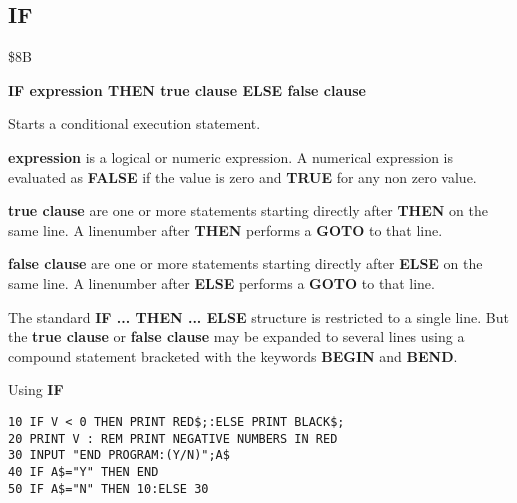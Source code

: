 \subsection{IF}
\begin{description}[leftmargin=2cm,style=nextline]
\item [Token:] \$8B
\item [Format:] {\bf IF expression THEN true clause ELSE false clause}
\item [Usage:] Starts a conditional execution
               statement.

               {\bf expression} is a logical or numeric expression.
               A numerical expression is evaluated as {\bf FALSE}
               if the value is zero and {\bf TRUE} for any non zero
               value.

               {\bf true clause} are one or more statements starting
               directly after {\bf THEN} on the same line.
               A linenumber after {\bf THEN} performs a
               {\bf GOTO} to that line.

               {\bf false clause} are one or more statements starting
               directly after {\bf ELSE} on the same line.
               A linenumber after {\bf ELSE} performs a
               {\bf GOTO} to that line.

\item [Remarks:]
               The standard {\bf IF ... THEN ... ELSE} structure
               is restricted to a single line. But the {\bf true clause}
               or {\bf false clause} may be expanded to several lines
               using a compound statement bracketed with the keywords
               {\bf BEGIN} and {\bf BEND}.
\item [Example:]
                Using {\bf IF}
\begin{tcolorbox}[colback=black,coltext=white]
\verbatimfont{\codefont}
\begin{verbatim}
10 IF V < 0 THEN PRINT RED$;:ELSE PRINT BLACK$;
20 PRINT V : REM PRINT NEGATIVE NUMBERS IN RED
30 INPUT "END PROGRAM:(Y/N)";A$
40 IF A$="Y" THEN END
50 IF A$="N" THEN 10:ELSE 30

\end{verbatim}
\end{tcolorbox}
\end{description}


\newpage
